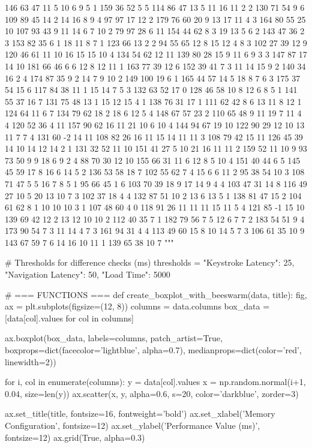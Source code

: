 \begin{pyverbatim}
{146	63	47	11	5	10	6	9	5	1	159	36	52	5	5
114	86	47	13	5	11	16	11	2	2	130	71	54	9	6
109	89	45	14	2	14	16	8	9	4	97	97	17	12	2
179	76	60	20	9	13	17	11	4	3	164	80	55	25	10
107	93	43	9	11	14	6	7	10	2	79	97	28	6	11
154	44	62	8	3	19	13	5	6	2	143	47	36	2	3
153	82	35	6	1	18	11	8	7	1	123	66	13	2	2
94	55	65	12	8	15	12	4	8	3	102	27	39	12	9
120	46	61	11	10	16	15	15	10	4	134	54	62	12	11
139	80	28	15	9	11	6	9	3	3	147	87	17	14	10
181	66	46	6	6	12	8	12	11	1	163	77	39	12	6
152	39	41	7	3	11	14	15	9	2	140	34	16	2	4
174	87	35	9	2	14	7	9	10	2	149	100	19	6	1
165	44	57	14	5	18	8	7	6	3	175	37	54	15	6
117	84	38	11	1	15	14	7	5	3	132	63	52	17	0
128	46	58	10	8	12	6	8	5	1	141	55	37	16	7
131	75	48	13	1	15	12	15	4	1	138	76	31	17	1
111	62	42	8	6	13	11	8	12	1	124	64	11	6	7
134	79	62	18	2	18	6	12	5	4	148	67	57	23	2
110	65	48	9	11	19	7	11	4	4	120	52	36	4	11
157	90	62	16	11	21	10	6	10	4	144	94	67	19	10
122	90	29	12	10	13	11	7	7	4	131	60	-2	14	11
108	82	26	16	11	15	14	11	11	3	108	79	42	15	11
126	45	39	14	10	14	12	14	2	1	131	32	52	11	10
151	41	27	5	10	21	16	11	11	2	159	52	11	10	9
93	73	50	9	9	18	6	9	2	4	88	70	30	12	10
155	66	31	11	6	12	8	5	10	4	151	40	44	6	5
145	45	59	17	8	16	6	14	5	2	136	53	58	18	7
102	55	62	7	4	15	6	6	11	2	95	38	54	10	3
108	71	47	5	5	16	7	8	5	1	95	66	45	1	6
103	70	39	18	9	17	14	9	4	4	103	47	31	14	8
116	49	27	10	5	20	13	10	7	3	102	37	18	4	4
132	87	51	10	2	13	6	13	5	1	138	81	47	15	2
104	61	62	8	1	10	10	10	3	1	107	48	60	4	0
118	91	26	11	11	11	15	11	5	4	121	85	-1	15	10
139	69	42	12	2	13	12	10	10	2	112	40	35	7	1
182	79	56	7	5	12	6	7	7	2	183	54	51	9	4
173	90	54	7	3	11	14	4	7	3	161	94	31	4	4
113	49	60	15	8	10	14	5	7	3	106	61	35	10	9
143	67	59	7	6	14	16	10	11	1	139	65	38	10	7
"""
}

# Thresholds for difference checks (ms)
thresholds = {
    "Keystroke Latency": 25,
    "Navigation Latency": 50,
    "Load Time": 5000
}


# === FUNCTIONS ===
def create_boxplot_with_beeswarm(data, title):
    fig, ax = plt.subplots(figsize=(12, 8))
    columns = data.columns
    box_data = [data[col].values for col in columns]

    ax.boxplot(box_data, labels=columns, patch_artist=True,
               boxprops=dict(facecolor='lightblue', alpha=0.7),
               medianprops=dict(color='red', linewidth=2))

    for i, col in enumerate(columns):
        y = data[col].values
        x = np.random.normal(i+1, 0.04, size=len(y))
        ax.scatter(x, y, alpha=0.6, s=20, color='darkblue', zorder=3)

    ax.set_title(title, fontsize=16, fontweight='bold')
    ax.set_xlabel('Memory Configuration', fontsize=12)
    ax.set_ylabel('Performance Value (ms)', fontsize=12)
    ax.grid(True, alpha=0.3)


\end{pyverbatim}
